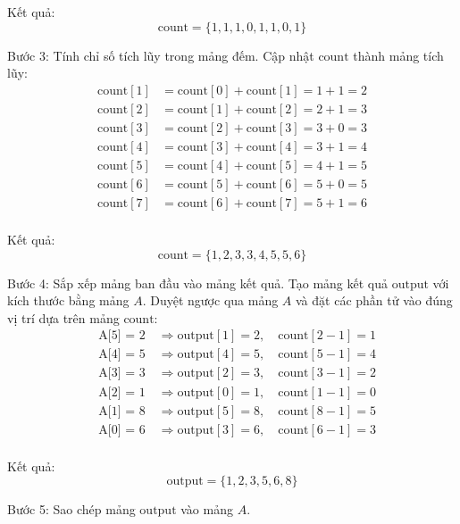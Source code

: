 Kết quả:
\[
\text{count} = \{1, 1, 1, 0, 1, 1, 0, 1\}
\]

Bước 3: Tính chỉ số tích lũy trong mảng đếm. Cập nhật \( \text{count} \) thành mảng tích lũy:
\[
\begin{aligned}
\text{count}[1] & = \text{count}[0] + \text{count}[1] = 1 + 1 = 2 \\
\text{count}[2] & = \text{count}[1] + \text{count}[2] = 2 + 1 = 3 \\
\text{count}[3] & = \text{count}[2] + \text{count}[3] = 3 + 0 = 3 \\
\text{count}[4] & = \text{count}[3] + \text{count}[4] = 3 + 1 = 4 \\
\text{count}[5] & = \text{count}[4] + \text{count}[5] = 4 + 1 = 5 \\
\text{count}[6] & = \text{count}[5] + \text{count}[6] = 5 + 0 = 5 \\
\text{count}[7] & = \text{count}[6] + \text{count}[7] = 5 + 1 = 6 \\
\end{aligned}
\]

Kết quả:
\[
\text{count} = \{1, 2, 3, 3, 4, 5, 5, 6\}
\]

Bước 4: Sắp xếp mảng ban đầu vào mảng kết quả. Tạo mảng kết quả \( \text{output} \) với kích thước bằng mảng \( A \). Duyệt ngược qua mảng \( A \) và đặt các phần tử vào đúng vị trí dựa trên mảng \( \text{count} \):
\[
\begin{aligned}
&\text{A[5] = 2} \quad \Rightarrow \text{output}[1] = 2, \quad \text{count}[2 - 1] = 1 \\
&\text{A[4] = 5} \quad \Rightarrow \text{output}[4] = 5, \quad \text{count}[5 - 1] = 4 \\
&\text{A[3] = 3} \quad \Rightarrow \text{output}[2] = 3, \quad \text{count}[3 - 1] = 2 \\
&\text{A[2] = 1} \quad \Rightarrow \text{output}[0] = 1, \quad \text{count}[1 - 1] = 0 \\
&\text{A[1] = 8} \quad \Rightarrow \text{output}[5] = 8, \quad \text{count}[8 - 1] = 5 \\
&\text{A[0] = 6} \quad \Rightarrow \text{output}[3] = 6, \quad \text{count}[6 - 1] = 3 \\
\end{aligned}
\]

Kết quả:
\[
\text{output} = \{1, 2, 3, 5, 6, 8\}
\]

Bước 5: Sao chép mảng \( \text{output} \) vào mảng \( A \).


